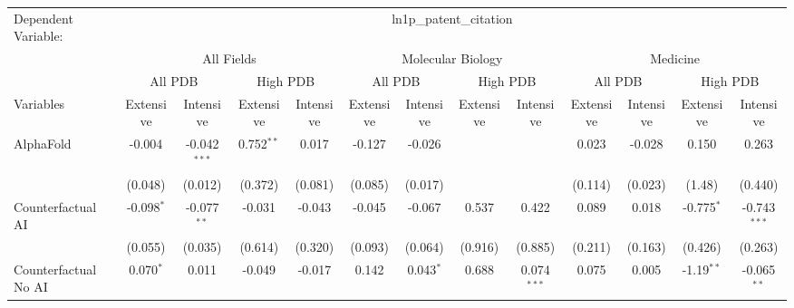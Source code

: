 \begingroup
\centering
\begin{tabular}{lcccccccccccc}
   \tabularnewline \midrule \midrule
   Dependent Variable: & \multicolumn{12}{c}{ln1p\_patent\_citation}\\
 & \multicolumn{4}{c}{All Fields} & \multicolumn{4}{c}{Molecular Biology} & \multicolumn{4}{c}{Medicine} \\
\cmidrule(lr){2-5} \cmidrule(lr){6-9} \cmidrule(lr){10-13}
 & \multicolumn{2}{c}{All PDB} & \multicolumn{2}{c}{High PDB} & \multicolumn{2}{c}{All PDB} & \multicolumn{2}{c}{High PDB} & \multicolumn{2}{c}{All PDB} & \multicolumn{2}{c}{High PDB} \\
\cmidrule(lr){2-3} \cmidrule(lr){4-5} \cmidrule(lr){6-7} \cmidrule(lr){8-9} \cmidrule(lr){10-11} \cmidrule(lr){12-13}
Variables & \multicolumn{1}{c}{Extensive} & \multicolumn{1}{c}{Intensive} & \multicolumn{1}{c}{Extensive} & \multicolumn{1}{c}{Intensive} & \multicolumn{1}{c}{Extensive} & \multicolumn{1}{c}{Intensive} & \multicolumn{1}{c}{Extensive} & \multicolumn{1}{c}{Intensive} & \multicolumn{1}{c}{Extensive} & \multicolumn{1}{c}{Intensive} & \multicolumn{1}{c}{Extensive} & \multicolumn{1}{c}{Intensive} \\
\cmidrule(lr){1-1}\cmidrule(lr){2-2} \cmidrule(lr){3-3} \cmidrule(lr){4-4} \cmidrule(lr){5-5} \cmidrule(lr){6-6} \cmidrule(lr){7-7} \cmidrule(lr){8-8} \cmidrule(lr){9-9} \cmidrule(lr){10-10} \cmidrule(lr){11-11} \cmidrule(lr){12-12} \cmidrule(lr){13-13}
   AlphaFold                                & -0.004       & -0.042$^{***}$ & 0.752$^{**}$ & 0.017   & -0.127  & -0.026        &         &               & 0.023   & -0.028       & 0.150        & 0.263\\   
                                            & (0.048)      & (0.012)        & (0.372)      & (0.081) & (0.085) & (0.017)       &         &               & (0.114) & (0.023)      & (1.48)       & (0.440)\\   
   Counterfactual AI                        & -0.098$^{*}$ & -0.077$^{**}$  & -0.031       & -0.043  & -0.045  & -0.067        & 0.537   & 0.422         & 0.089   & 0.018        & -0.775$^{*}$ & -0.743$^{***}$\\   
                                            & (0.055)      & (0.035)        & (0.614)      & (0.320) & (0.093) & (0.064)       & (0.916) & (0.885)       & (0.211) & (0.163)      & (0.426)      & (0.263)\\   
   Counterfactual No AI                     & 0.070$^{*}$  & 0.011          & -0.049       & -0.017  & 0.142   & 0.043$^{*}$   & 0.688   & 0.074$^{***}$ & 0.075   & 0.005        & -1.19$^{**}$ & -0.065$^{**}$\\   

\end{tabular}
